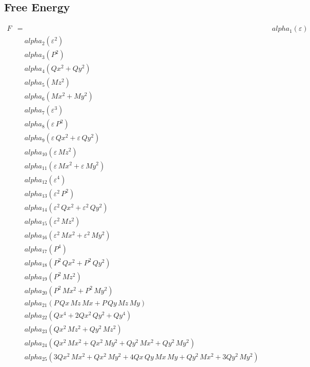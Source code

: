 \documentclass{article}
\begin{document}
\subsection*{Free Energy}

\begin{align*}
F &=
  &\quad alpha_{1} \left(ε\right) \\
  &\quad alpha_{2} \left(ε^{2}\right) \\
  &\quad alpha_{3} \left(P^{2}\right) \\
  &\quad alpha_{4} \left(Qx^{2} + Qy^{2}\right) \\
  &\quad alpha_{5} \left(Mz^{2}\right) \\
  &\quad alpha_{6} \left(Mx^{2} + My^{2}\right) \\
  &\quad alpha_{7} \left(ε^{3}\right) \\
  &\quad alpha_{8} \left(ε\,P^{2}\right) \\
  &\quad alpha_{9} \left(ε\,Qx^{2} + ε\,Qy^{2}\right) \\
  &\quad alpha_{10} \left(ε\,Mz^{2}\right) \\
  &\quad alpha_{11} \left(ε\,Mx^{2} + ε\,My^{2}\right) \\
  &\quad alpha_{12} \left(ε^{4}\right) \\
  &\quad alpha_{13} \left(ε^{2}\,P^{2}\right) \\
  &\quad alpha_{14} \left(ε^{2}\,Qx^{2} + ε^{2}\,Qy^{2}\right) \\
  &\quad alpha_{15} \left(ε^{2}\,Mz^{2}\right) \\
  &\quad alpha_{16} \left(ε^{2}\,Mx^{2} + ε^{2}\,My^{2}\right) \\
  &\quad alpha_{17} \left(P^{4}\right) \\
  &\quad alpha_{18} \left(P^{2}\,Qx^{2} + P^{2}\,Qy^{2}\right) \\
  &\quad alpha_{19} \left(P^{2}\,Mz^{2}\right) \\
  &\quad alpha_{20} \left(P^{2}\,Mx^{2} + P^{2}\,My^{2}\right) \\
  &\quad alpha_{21} \left(P\,Qx\,Mz\,Mx + P\,Qy\,Mz\,My\right) \\
  &\quad alpha_{22} \left(Qx^{4} + 2Qx^{2}\,Qy^{2} + Qy^{4}\right) \\
  &\quad alpha_{23} \left(Qx^{2}\,Mz^{2} + Qy^{2}\,Mz^{2}\right) \\
  &\quad alpha_{24} \left(Qx^{2}\,Mx^{2} + Qx^{2}\,My^{2} + Qy^{2}\,Mx^{2} + Qy^{2}\,My^{2}\right) \\
  &\quad alpha_{25} \left(3Qx^{2}\,Mx^{2} + Qx^{2}\,My^{2} + 4Qx\,Qy\,Mx\,My + Qy^{2}\,Mx^{2} + 3Qy^{2}\,My^{2}\right) \\

\end{align*}
\end{document}
